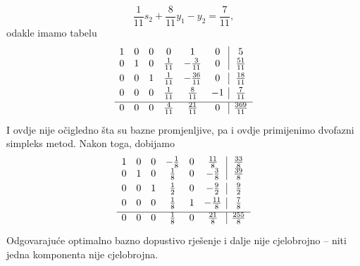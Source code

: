 \documentclass[b5paper, utf8, 11pt, colorlinks]{book}
\theoremstyle{definition}
\begin{document}
 $$ \frac{1}{11} s_2 + \frac{8}{11} y_1 - y_2 = \frac{7}{11},$$
 odakle imamo tabelu 
 $$\begin{array}{cccccc| c}
 1   &   0   &  0  &   0             &   1  &   0              &   5 \\\vspace{1mm}
 0   &   1   &  0  &  \frac{1}{11}    &   -\frac{3}{11}    &  0 & \frac{51}{11} \\\vspace{1mm}
 0   &   0   &  1  &  \frac{1}{11}    & -\frac{36}{11}       & 0 & \frac{18}{11}  \\\vspace{1mm}
 0   &   0   &  0  &  \frac{1}{11}    &  \frac{8}{11}   & -1 & \frac{7}{11} \\ \hline\vspace{1mm}
 0   &   0   &  0  &   \frac{4}{11}   &   \frac{21}{11} & 0 & \frac{369}{11}
\end{array} $$
I ovdje nije očigledno šta su bazne promjenljive, pa i ovdje primijenimo dvofazni simpleks metod. Nakon toga, dobijamo 
 $$\begin{array}{cccccc| c}
1    &   0   &   0   &  -\frac{1}{8}   &   0    &    \frac{11}{8}    &  \frac{33}{8} \\\vspace{1mm}
0    &   1   &   0   &   \frac{1}{8}   &   0    &    -\frac{3}{8}    & \frac{39}{8} \\\vspace{1mm}
0    &   0   &   1   &   \frac{1}{2}   &   0    &    - \frac{9}{2}   & \frac{9}{2} \\\vspace{1mm}
0    &   0   &   0   &   \frac{1}{8}   &   1    &    - \frac{11}{8}  & \frac{7}{8} \\ \hline\vspace{1mm}
0    &   0   &   0   &   \frac{1}{8}   &   0    &     \frac{21}{8}   & \frac{255}{8}
\end{array} $$
Odgovarajuće optimalno bazno dopustivo rješenje i dalje nije cjelobrojno -- niti jedna komponenta nije cjelobrojna. 
\end{document}
